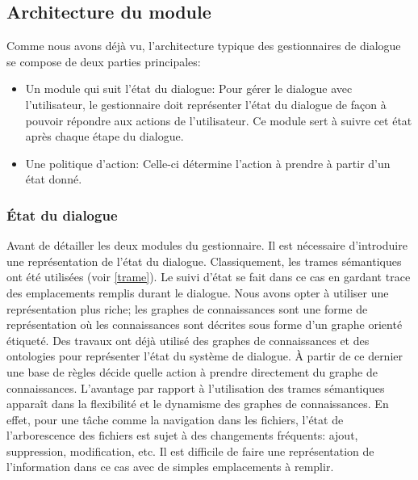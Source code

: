 \subsection{Architecture du module}
Comme nous avons déjà vu, l'architecture typique des gestionnaires de dialogue se compose de deux parties principales: 
\begin{itemize}
	\item Un module qui suit l'état du dialogue: Pour gérer le dialogue avec l'utilisateur, le gestionnaire doit représenter l'état du dialogue de façon à pouvoir répondre aux actions de l'utilisateur. Ce module sert à suivre cet état après chaque étape du dialogue.
	\item Une politique d'action: Celle-ci détermine l'action à prendre à partir d'un état donné.
\end{itemize}
\subsubsection{État du dialogue}
Avant de détailler les deux modules du gestionnaire. Il est nécessaire d'introduire une représentation de l'état du dialogue. Classiquement, les trames sémantiques ont été utilisées (voir \ref{trame}). Le suivi d'état se fait dans ce cas en gardant trace des emplacements remplis durant le dialogue.
Nous avons opter à utiliser une représentation plus riche; les graphes de connaissances sont une forme de représentation où les connaissances sont décrites sous forme d'un graphe orienté étiqueté. Des travaux ont déjà utilisé des graphes de connaissances\cite{Stoyanchev2018} et des ontologies\cite{Wessel2019} pour représenter l'état du système de dialogue. À partir de ce dernier une base de règles décide quelle action à prendre directement du graphe de connaissances. L'avantage par rapport à l'utilisation des trames sémantiques apparaît dans la flexibilité et le dynamisme des graphes de connaissances. En effet, pour une tâche comme la navigation dans les fichiers, l'état de l'arborescence des fichiers est sujet à des changements fréquents: ajout, suppression, modification, etc. Il est difficile de faire une représentation de l'information dans ce cas avec de simples emplacements à remplir.
